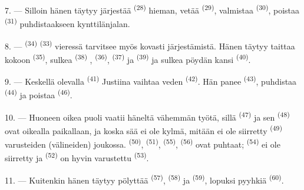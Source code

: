 7. --- Silloin hänen täytyy järjestää  \textsuperscript{(28)}
hieman, vetää  \textsuperscript{(29)}, valmistaa
 \textsuperscript{(30)}, poistaa 
\textsuperscript{(31)} puhdistaakseen kynttilänjalan.

\VUsaut{5.0mm}
\VUsaut{3.0mm}

8. ---  \textsuperscript{(34)} 
\textsuperscript{(33)} vieressä tarvitsee myös kovasti järjestämistä. Hänen
täytyy taittaa kokoon  \textsuperscript{(35)}, sulkea
 \textsuperscript{(38)} ,
 \textsuperscript{(36)},  \textsuperscript{(37)} ja
 \textsuperscript{(39)} ja sulkea pöydän kansi
 \textsuperscript{(40)}.

9. --- Keskellä olevalla 
\textsuperscript{(41)} Justiina vaihtaa veden 
\textsuperscript{(42)}. Hän panee 
 \textsuperscript{(43)}, puhdistaa 
\textsuperscript{(44)} ja poistaa  \textsuperscript{(46)}.

10. --- Huoneen oikea puoli vaatii häneltä vähemmän työtä, sillä
 \textsuperscript{(47)} ja sen 
\textsuperscript{(48)} ovat oikealla paikallaan, ja koska sää ei ole kylmä,
mitään ei ole siirretty  \textsuperscript{(49)} varusteiden
(välineiden) joukossa.  \textsuperscript{(50)},
 \textsuperscript{(51)}, 
\textsuperscript{(55)},  \textsuperscript{(56)} ovat
puhtaat;  \textsuperscript{(54)} ei ole siirretty ja
 \textsuperscript{(52)} on hyvin varustettu
 \textsuperscript{(53)}.



11. --- Kuitenkin hänen täytyy pölyttää 
\textsuperscript{(57)},  \textsuperscript{(58)} ja
 \textsuperscript{(59)}, lopuksi pyyhkiä 
\textsuperscript{(60)}.

